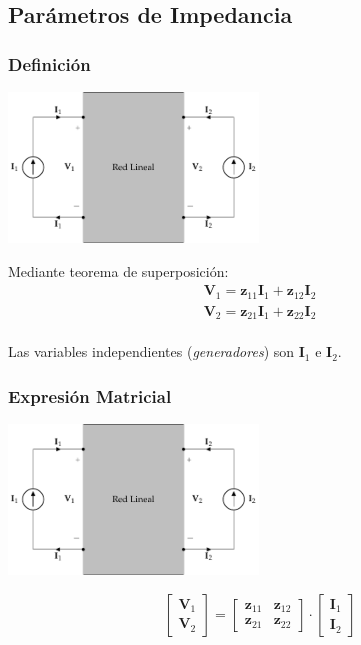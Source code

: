 \subsection{Parámetros de Impedancia}
\label{sec:org99c6d5d}

\subsubsection{Definición}
\label{sec:orga66e998}
\begin{center}
\includegraphics[height=4cm]{../figs/cuadripolo_fuentes_corriente.pdf}
\end{center}

Mediante teorema de superposición:
\[
\begin{array}{l}
  \mathbf{V}_1 = \mathbf{z}_{11} \mathbf{I}_1 + \mathbf{z}_{12} \mathbf{I}_2\\
  \mathbf{V}_2 = \mathbf{z}_{21} \mathbf{I}_1 + \mathbf{z}_{22} \mathbf{I}_2\\
\end{array}
\]

Las variables independientes (\emph{generadores}) son \(\mathbf{I}_1\) e \(\mathbf{I}_2\).

\subsubsection{Expresión Matricial}
\label{sec:orgf922a0b}
\begin{center}
\includegraphics[height=4cm]{../figs/cuadripolo_fuentes_corriente.pdf}
\end{center}

\[
  \left[
    \begin{array}{c}
      \mathbf{V}_1\\
      \mathbf{V}_2
    \end{array}
  \right] =
  \left[
    \begin{array}{cc}
      \mathbf{z}_{11} & \mathbf{z}_{12}\\
      \mathbf{z}_{21} & \mathbf{z}_{22}
    \end{array}
  \right] \cdot
  \left[
    \begin{array}{c}
      \mathbf{I}_1\\
      \mathbf{I}_2
    \end{array}
  \right]
\]

